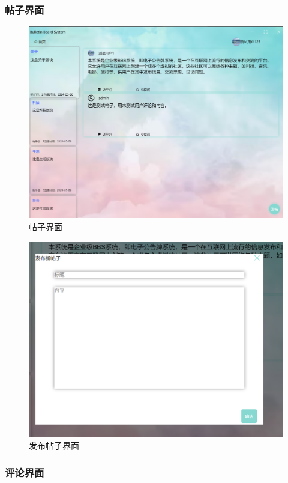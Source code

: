 \documentclass[UTF8]{ctexart}
\begin{document}
\subsubsection{帖子界面}

\begin{figure}[H]
  \centering
  \includegraphics[scale=0.3]{系统实现/用户帖子.png}
  \caption{帖子界面}
\end{figure}

\begin{figure}[H]
  \centering
  \includegraphics[scale=0.3]{系统实现/发布帖子.png}
  \caption{发布帖子界面}
\end{figure}

\subsubsection{评论界面}
\end{document}
